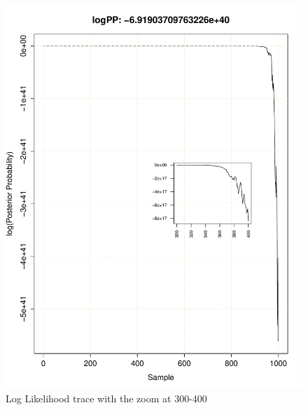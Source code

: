 \documentclass[11pt]{labbook}
\begin{document}
    \begin{figure}
        \centering
        \includegraphics[scale=.75]{FONSE_Plots/2016/June_29/LogLikeTrace_300-400}
        \caption{Log Likelihood trace with the zoom at 300-400}
        \label{fig:JUN29_300-400}
    \end{figure}
\end{document}
